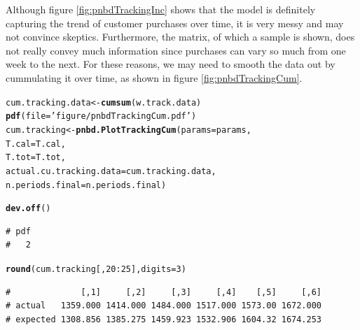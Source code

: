 \documentclass[10pt, letterpaper, onecolumn, oneside, final]{article}\usepackage[]{graphicx}\usepackage[]{color}
\makeatletter
\newcommand{\hlnum}[1]{\textcolor[rgb]{0.686,0.059,0.569}{#1}}%
\newcommand{\hlstr}[1]{\textcolor[rgb]{0.192,0.494,0.8}{#1}}%
\newcommand{\hlopt}[1]{\textcolor[rgb]{0,0,0}{#1}}%
\newcommand{\hlstd}[1]{\textcolor[rgb]{0.345,0.345,0.345}{#1}}%
\newcommand{\hlkwb}[1]{\textcolor[rgb]{0.69,0.353,0.396}{#1}}%
\newcommand{\hlkwc}[1]{\textcolor[rgb]{0.333,0.667,0.333}{#1}}%
\newcommand{\hlkwd}[1]{\textcolor[rgb]{0.737,0.353,0.396}{\textbf{#1}}}%
\newenvironment{kframe}{%
 \def\at@end@of@kframe{}%
 \ifinner\ifhmode%
  \def\at@end@of@kframe{\end{minipage}}%
  \begin{minipage}{\columnwidth}%
 \fi\fi%
 \def\FrameCommand##1{\hskip\@totalleftmargin \hskip-\fboxsep
 \colorbox{shadecolor}{##1}\hskip-\fboxsep
     \hskip-\linewidth \hskip-\@totalleftmargin \hskip\columnwidth}%
 \MakeFramed {\advance\hsize-\width
   \@totalleftmargin\z@ \linewidth\hsize
   \@setminipage}}%
 {\par\unskip\endMakeFramed%
 \at@end@of@kframe}
\newenvironment{knitrout}{}{} %
\makeatother
\begin{document}
Although figure \ref{fig:pnbdTrackingInc} shows that the model is
definitely capturing the trend of customer purchases over time, it is
very messy and may not convince skeptics. Furthermore, the matrix, of
which a sample is shown, does not really convey much information since
purchases can vary so much from one week to the next. For these
reasons, we may need to smooth the data out by cummulating it over
time, as shown in figure \ref{fig:pnbdTrackingCum}.



\begin{knitrout}
\color{fgcolor}\begin{kframe}
\begin{alltt}
\hlstd{cum.tracking.data} \hlkwb{<-} \hlkwd{cumsum}\hlstd{(w.track.data)}
\hlkwd{pdf}\hlstd{(}\hlkwc{file} \hlstd{=} \hlstr{'figure/pnbdTrackingCum.pdf'}\hlstd{)}
\hlstd{cum.tracking} \hlkwb{<-} \hlkwd{pnbd.PlotTrackingCum}\hlstd{(}\hlkwc{params} \hlstd{= params,}
                                     \hlkwc{T.cal} \hlstd{= T.cal,}
                                     \hlkwc{T.tot} \hlstd{= T.tot,}
                                     \hlkwc{actual.cu.tracking.data} \hlstd{= cum.tracking.data,}
                                     \hlkwc{n.periods.final} \hlstd{= n.periods.final)}
\end{alltt}


{\ttfamily\noindent\color{warningcolor}{\# Warning in FUN(X[[i]], ...): Maximum vector length not a multiple of the length of actual.cu.tracking.data}}\begin{alltt}
\hlkwd{dev.off}\hlstd{()}
\end{alltt}
\begin{verbatim}
# pdf 
#   2
\end{verbatim}
\begin{alltt}
\hlkwd{round}\hlstd{(cum.tracking[,}\hlnum{20}\hlopt{:}\hlnum{25}\hlstd{],} \hlkwc{digits} \hlstd{=} \hlnum{3}\hlstd{)}
\end{alltt}
\begin{verbatim}
#              [,1]     [,2]     [,3]     [,4]    [,5]     [,6]
# actual   1359.000 1414.000 1484.000 1517.000 1573.00 1672.000
# expected 1308.856 1385.275 1459.923 1532.906 1604.32 1674.253
\end{verbatim}
\end{kframe}
\end{knitrout}
\end{document}
